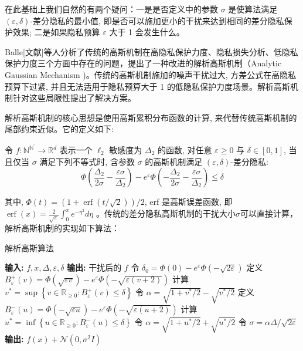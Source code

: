 在此基础上我们自然的有两个疑问：一是是否定义中的参数 $\sigma$ 是使算法满足 $(\varepsilon, \delta)$-差分隐私的最小值, 即是否可以施加更小的干扰来达到相同的差分隐私保护效果; 二是如果隐私预算 $\varepsilon$ 大于 1 会发生什么。

Balle[文献]等人分析了传统的高斯机制在高隐私保护力度、隐私损失分析、低隐私保护力度三个方面中存在的问题，提出了一种改进的解析高斯机制（Analytic Gaussian Mechanism )。传统的高斯机制施加的噪声干扰过大, 方差公式在高隐私预算下过紧, 并且无法适用于隐私预算大于 1 的低隐私保护力度场景。解析高斯机制针对这些局限性提出了解决方案。

解析高斯机制的核心思想是使用高斯累积分布函数的计算, 来代替传统高斯机制的尾部约束近似。它的定义如下:
\begin{define}\label{解析高斯机制}
令 $f: \mathbb{N}^{\mathbb{N}^{\prime}} \rightarrow \mathbb{R}^{d}$ 表示一个 $\ell_{2}$ 敏感度为 $\Delta_{2}$ 的函数, 对任意 $\varepsilon \geq 0$ 与 $\delta \in[0,1]$, 当且仅当 $\sigma$ 满足下列不等式时, 含参数 $\sigma$ 的高斯机制满足 $(\varepsilon, \delta)$-差分隐私:
\begin{equation}\label{eq:解析高斯机制}
\Phi\left(\frac{\Delta_{2}}{2 \sigma}-\frac{\varepsilon \sigma}{\Delta_{2}}\right)-e^{\varepsilon} \Phi\left(-\frac{\Delta_{2}}{2 \sigma}-\frac{\varepsilon \sigma}{\Delta_{2}}\right) \leq \delta
\end{equation}
\end{define}

其中, $\Phi(t)=(1+\operatorname{erf}(t / \sqrt{2})) / 2$, erf 是高斯误差函数, 即 $\operatorname{erf}(x)=\frac{2}{\sqrt{\pi}} \int_{0}^{x} e^{-\eta^{2}} d \eta$ 。传统的差分隐私高斯机制的干扰大小$\sigma$可以直接计算，解析高斯机制的实现如下算法：

\begin{algorithm}[!htb]
	\caption{解析高斯算法}
	\label{解析高斯算法}
	\begin{algorithmic}[1]
		\footnotesize
		\STATE \textbf{输入:} $f, x, \Delta, \varepsilon, \delta$
		\STATE \textbf{输出:} 干扰后的 $f$
		\STATE 令 $\delta_{0}=\Phi(0)-e^{\varepsilon} \Phi(-\sqrt{2 \varepsilon})$
			\STATE 定义 $B_{\varepsilon}^{+}(v)=\Phi(\sqrt{\varepsilon v})-e^{\varepsilon} \Phi(-\sqrt{\varepsilon(v+2)})$
			\STATE 计算 $v^{*}=\sup \left\{v \in \mathbb{R}_{\geq 0}: B_{\varepsilon}^{+}(v) \leq \delta\right\}$
            \STATE 令 $\alpha=\sqrt{1+v^{*} / 2}-\sqrt{v^{*} / 2}$
        \ELSE
        	\STATE 定义 $B_{\varepsilon}^{-}(u)=\Phi(-\sqrt{\varepsilon u})-e^{\varepsilon} \Phi(-\sqrt{\varepsilon(u+2)})$
        	\STATE 计算 $u^{*}=\inf \left\{u \in \mathbb{R}_{\geq 0}: B_{\varepsilon}^{-}(u) \leq \delta\right\}$
        	\STATE 令 $\alpha=\sqrt{1+u^{*} / 2}+\sqrt{u^{*} / 2}$
        \ENDIF
    	\STATE 令 $\sigma=\alpha \Delta / \sqrt{2 \varepsilon}$
    	\STATE \textbf{输出:} $f(x)+\mathcal{N}\left(0, \sigma^{2} I\right)$
	\end{algorithmic}
\end{algorithm}


